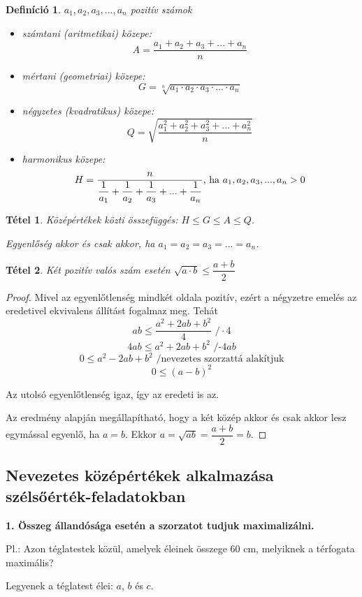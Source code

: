 \documentclass[12pt,a4paper]{article}
\newtheorem{theorem}{Tétel} [section]
\newtheorem{definition}{Definíció} [section]
\begin{document}
\begin{definition}
$a_1, a_2, a_3, ..., a_n$ pozitív számok
\begin{itemize}
\item számtani (aritmetikai) közepe: $$A=\dfrac{a_1+a_2+a_3+...+a_n}{n}$$
\item mértani (geometriai) közepe: $$G=\sqrt[n]{a_1\cdot a_2\cdot a_3\cdot ...\cdot a_n}$$
\item négyzetes (kvadratikus) közepe: $$Q=\sqrt{\dfrac{a_1^2+a_2^2+a_3^2+...+a_n^2}{n}}$$
\item harmonikus közepe: $$H=\dfrac{n}{\dfrac{1}{a_1}+\dfrac{1}{a_2}+\dfrac{1}{a_3}+...+\dfrac{1}{a_n}} \text{\normalfont , ha }a_1, a_2, a_3, ..., a_n>0$$
\end{itemize}
\end{definition}

\begin{theorem}
Középértékek közti összefüggés: $H\leq G\leq A \leq Q$.
 
Egyenlőség akkor és csak akkor, ha $a_1=a_2=a_3=...=a_n$.
\end{theorem}

\begin{theorem}
Két pozitív valós szám esetén $\sqrt{a\cdot b}\leq \dfrac{a+b}{2}$
\end{theorem}
\begin{proof}
Mivel az egyenlőtlenség mindkét oldala pozitív, ezért a négyzetre emelés az eredetivel ekvivalens állítást fogalmaz meg. Tehát
$$ab\leq \dfrac{a^2+2ab+b^2}{4}\text{  /}\cdot \text{4}$$
$$4ab\leq a^2+2ab+b^2\text{  /-4}ab$$
$$0\leq a^2-2ab+b^2 \text{ /nevezetes szorzattá alakítjuk}$$
$$0\leq (a-b)^2$$

Az utolsó egyenlőtlenség igaz, így az eredeti is az.

Az eredmény alapján megállapítható, hogy a két közép akkor és csak akkor lesz egymással egyenlő, ha $a = b$. Ekkor $a=\sqrt{ab}=\dfrac{a+b}{2}=b$.
\end{proof}

\subsection{Nevezetes középértékek alkalmazása szélsőérték-feladatokban}
\textbf{1. Összeg állandósága esetén a szorzatot tudjuk maximalizálni.}

Pl.: Azon téglatestek közül, amelyek éleinek összege 60 cm, melyiknek a térfogata maximális?

Legyenek a téglatest élei: $a$, $b$ és $c$.
\end{document}
